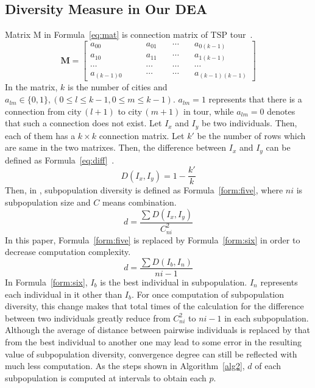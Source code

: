 \documentclass[journal,onecolumn]{IEEEtran}
\begin{document}
%
\subsection{Diversity Measure in Our DEA}

%
Matrix M in Formula~\ref{eq:mat} is connection matrix of TSP tour~\cite{chang2010dynamic}.
\begin{equation}
\mathbf{M} =
 \left[{\begin{array}{cccc}
 a_{00} \quad & \quad a_{01}  & \quad \cdots  &  \quad a_{0(k-1)}  \\
 a_{10} \quad & \quad a_{11}  & \quad \cdots  &  \quad a_{1(k-1)}  \\
 \cdots \quad & \quad \cdots  & \quad \cdots  &  \quad \cdots    \\
 a_{(k-1)0} \quad & \quad \cdots &  \quad \cdots & \quad a_{(k-1)(k-1)}
\end{array}} \right]
\label{eq:mat}
\end{equation}
In the matrix, $k$ is the number of cities and $a_{lm} \in \{0,1\}, (0\le l\le k-1,  0\le m\le k-1)$. $a_{lm} = 1$ represents that there is a connection from city\,$(l+1)$ to city\,$(m+1)$ in tour, while $a_{lm} = 0$ denotes that such a connection does not exist.
Let $I_x$ and $I_y$ be two individuals.
Then, each of them has a $k\times k$ connection matrix.
Let $k'$ be the number of rows which are same in the two matrixes.
Then, the difference between $I_x$ and $I_y$ can be defined as Formula~\ref{eq:diff}~\cite{chang2010dynamic}.
\begin{equation}
 D(I_x,I_y) = 1 - \frac{k'}{k}
\label{eq:diff}
\end{equation}
Then, in \cite{chang2010dynamic}, subpopulation diversity is defined as Formula~\ref{form:five}, where $ni$ is subpopulation size and $C$ means combination.
\begin{equation}
 d = \frac{\sum{D(I_x,I_y)}}{C_{ni}^2}
 \label{form:five}
\end{equation}
In this paper, Formula~\ref{form:five} is replaced by Formula~\ref{form:six}  in order to decrease computation complexity.
\begin{equation}
 d = \frac{\sum{D(I_b,I_n)}}{ni-1}
\label{form:six}
\end{equation}
In Formula~\ref{form:six}, $I_b$ is the best individual in subpopulation.
$I_n$ represents each individual in it other than $I_b$.
For once computation of subpopulation diversity, this change makes that total times of the calculation for the difference between two individuals greatly reduce from $C_{ni}^2$ to $ni-1$ in each subpopulation.
Although the average of distance between pairwise individuals is replaced by that from the best individual to another one may lead to some error in the resulting value of subpopulation diversity, convergence degree can still be reflected with much less computation.
As the steps shown in Algorithm~\ref{alg2}, $d$ of each subpopulation is computed at intervals to obtain each $p$.
%
\end{document}
